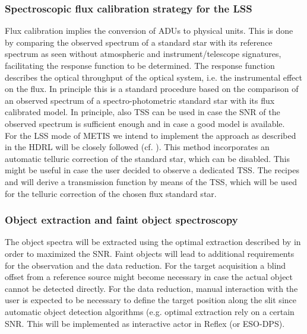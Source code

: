 \subsubsection{Spectroscopic flux calibration strategy for the LSS}\label{ssec:fluxcal}
Flux calibration implies the conversion of \ac{ADU}s to physical units. This is done by comparing the observed spectrum of a standard star with its reference spectrum as seen without atmospheric and instrument/telescope signatures, facilitating the response function to be determined. The response function describes the optical throughput of the optical system, i.e. the instrumental effect on the flux. In principle this is a standard procedure based on the comparison of an observed spectrum of a spectro-photometric standard star with its flux calibrated model. In principle, also \ac{TSS} can be used in case the \ac{SNR} of the observed spectrum is sufficient enough and in case a good model is available.\\
For the \ac{LSS} mode of \ac{METIS} we intend to implement the approach as described in the \ac{HDRL} will be closely followed (cf. \cite{hdrl-manual}). This method incorporates an automatic telluric correction of the standard star, which can be disabled. This might be useful in case the user decided to observe a dedicated \ac{TSS}. The recipes  and  will derive a transmission function by means of the \ac{TSS}, which will be used for the telluric correction of the chosen flux standard star. 





\subsubsection{Object extraction and faint object spectroscopy}\label{sec:fospectro}
The object spectra will be extracted using the optimal extraction described by \cite{pis21} in order to maximized the \ac{SNR}. 
Faint objects will lead to additional requirements for the observation and the data reduction. For the target acquisition a blind offset from a reference source might become necessary in case the actual object cannot be detected directly. For the data reduction, manual interaction with the user is expected to be necessary to define the target position along the slit since automatic object detection algorithms (e.g. optimal extraction %
rely on a certain \ac{SNR}. This will be implemented as interactive actor in Reflex (or ESO-DPS).